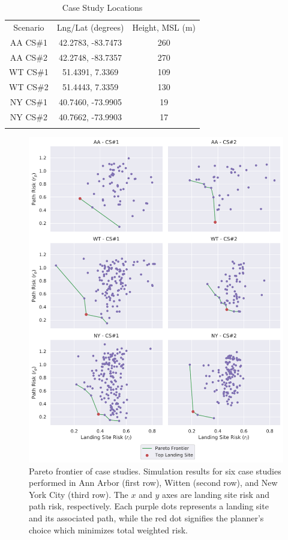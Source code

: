 \begin{table}[ht]
\centering
\caption[Emergency Landing Case Study Locations]{Case Study Locations}
\label{table:ch5_case_studies}
\begin{tabular}{c@{\qquad}c@{\qquad}c}
\hline\noalign{\smallskip}
Scenario   & Lng/Lat (degrees)        & Height, MSL (m)  \\
\noalign{\smallskip}\hline\noalign{\smallskip}
AA CS\#1    & 42.2783, -83.7473  & 260          \\
AA CS\#2    & 42.2748, -83.7357   & 270          \\
WT CS\#1    & 51.4391, 7.3369   & 109          \\
WT CS\#2    & 51.4443, 7.3359   & 130          \\
NY CS\#1    & 40.7460, -73.9905   & 19         \\
NY CS\#2    & 40.7662, -73.9903   & 17         \\
\noalign{\smallskip}\hline\noalign{\smallskip}
\end{tabular}
\end{table}

\begin{figure}[t]
    \centering
    \includegraphics[clip, trim=0.2cm 0cm 0cm 0cm, width=.80\linewidth]{chapter_5_mapping/imgs/all_pareto.pdf}
    \caption[Pareto frontier of case studies]{Pareto frontier of case studies. Simulation results for six case studies performed in Ann Arbor (first row), Witten (second row), and New York City (third row). The $x$ and $y$ axes are landing site risk and path risk, respectively. Each purple dots represents a landing site and its associated path, while the red dot signifies the planner's choice which minimizes total weighted risk.}
    \label{fig:ch5_all_pareto_plots}
\end{figure}

